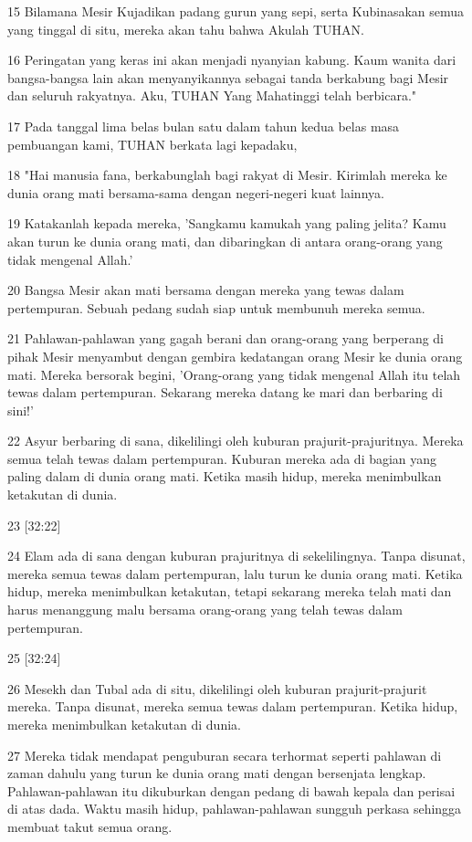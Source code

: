 \par 15 Bilamana Mesir Kujadikan padang gurun yang sepi, serta Kubinasakan semua yang tinggal di situ, mereka akan tahu bahwa Akulah TUHAN.
\par 16 Peringatan yang keras ini akan menjadi nyanyian kabung. Kaum wanita dari bangsa-bangsa lain akan menyanyikannya sebagai tanda berkabung bagi Mesir dan seluruh rakyatnya. Aku, TUHAN Yang Mahatinggi telah berbicara."
\par 17 Pada tanggal lima belas bulan satu dalam tahun kedua belas masa pembuangan kami, TUHAN berkata lagi kepadaku,
\par 18 "Hai manusia fana, berkabunglah bagi rakyat di Mesir. Kirimlah mereka ke dunia orang mati bersama-sama dengan negeri-negeri kuat lainnya.
\par 19 Katakanlah kepada mereka, 'Sangkamu kamukah yang paling jelita? Kamu akan turun ke dunia orang mati, dan dibaringkan di antara orang-orang yang tidak mengenal Allah.'
\par 20 Bangsa Mesir akan mati bersama dengan mereka yang tewas dalam pertempuran. Sebuah pedang sudah siap untuk membunuh mereka semua.
\par 21 Pahlawan-pahlawan yang gagah berani dan orang-orang yang berperang di pihak Mesir menyambut dengan gembira kedatangan orang Mesir ke dunia orang mati. Mereka bersorak begini, 'Orang-orang yang tidak mengenal Allah itu telah tewas dalam pertempuran. Sekarang mereka datang ke mari dan berbaring di sini!'
\par 22 Asyur berbaring di sana, dikelilingi oleh kuburan prajurit-prajuritnya. Mereka semua telah tewas dalam pertempuran. Kuburan mereka ada di bagian yang paling dalam di dunia orang mati. Ketika masih hidup, mereka menimbulkan ketakutan di dunia.
\par 23 [32:22]
\par 24 Elam ada di sana dengan kuburan prajuritnya di sekelilingnya. Tanpa disunat, mereka semua tewas dalam pertempuran, lalu turun ke dunia orang mati. Ketika hidup, mereka menimbulkan ketakutan, tetapi sekarang mereka telah mati dan harus menanggung malu bersama orang-orang yang telah tewas dalam pertempuran.
\par 25 [32:24]
\par 26 Mesekh dan Tubal ada di situ, dikelilingi oleh kuburan prajurit-prajurit mereka. Tanpa disunat, mereka semua tewas dalam pertempuran. Ketika hidup, mereka menimbulkan ketakutan di dunia.
\par 27 Mereka tidak mendapat penguburan secara terhormat seperti pahlawan di zaman dahulu yang turun ke dunia orang mati dengan bersenjata lengkap. Pahlawan-pahlawan itu dikuburkan dengan pedang di bawah kepala dan perisai di atas dada. Waktu masih hidup, pahlawan-pahlawan sungguh perkasa sehingga membuat takut semua orang.

